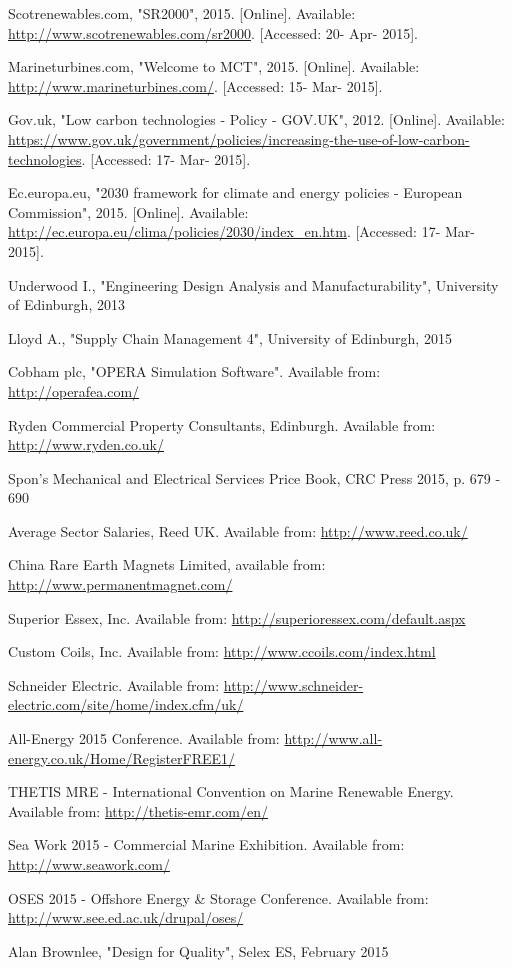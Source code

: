 \documentclass[a4paper,11pt]{article}
\begin{document}
\begin{thebibliography}{99}
	Scotrenewables.com, "SR2000", 2015. [Online]. Available: \url{http://www.scotrenewables.com/sr2000}. [Accessed: 20- Apr- 2015].
	
	Marineturbines.com, "Welcome to MCT", 2015. [Online]. Available: \url{http://www.marineturbines.com/}. [Accessed: 15- Mar- 2015].
	
	Gov.uk, "Low carbon technologies - Policy - GOV.UK", 2012. [Online]. Available: \url{https://www.gov.uk/government/policies/increasing-the-use-of-low-carbon-technologies}. [Accessed: 17- Mar- 2015].
	
	Ec.europa.eu, "2030 framework for climate and energy policies - European Commission", 2015. [Online]. Available: \url{http://ec.europa.eu/clima/policies/2030/index_en.htm}. [Accessed: 17- Mar- 2015].
	
	Underwood I., "Engineering Design Analysis and Manufacturability", University of Edinburgh, 2013
	
	Lloyd A., "Supply Chain Management 4", University of Edinburgh, 2015
	
	Cobham plc, "OPERA Simulation Software". Available from: \url{http://operafea.com/}
		
	Ryden Commercial Property Consultants, Edinburgh. Available from: \url{http://www.ryden.co.uk/}
	
	Spon's Mechanical and Electrical Services Price Book, CRC Press 2015, p. 679 - 690
	
	Average Sector Salaries, Reed UK. Available from: \url{http://www.reed.co.uk/}
	
	China Rare Earth Magnets Limited, available from: \url{http://www.permanentmagnet.com/}
	
	Superior Essex, Inc. Available from: \url{http://superioressex.com/default.aspx}
	
	Custom Coils, Inc. Available from: \url{http://www.ccoils.com/index.html}
	
	Schneider Electric. Available from: \url{http://www.schneider-electric.com/site/home/index.cfm/uk/}
	
	All-Energy 2015 Conference. Available from: \url{http://www.all-energy.co.uk/Home/RegisterFREE1/}
	
	THETIS MRE - International Convention on Marine Renewable Energy. Available from:   \url{http://thetis-emr.com/en/}
	
	Sea Work 2015 - Commercial Marine Exhibition. Available from: \url{http://www.seawork.com/}
	
	OSES 2015 - Offshore Energy \& Storage Conference. Available from: \url{http://www.see.ed.ac.uk/drupal/oses/}
	
	Alan Brownlee, "Design for Quality", Selex ES, February 2015

\end{thebibliography}
\end{document}
